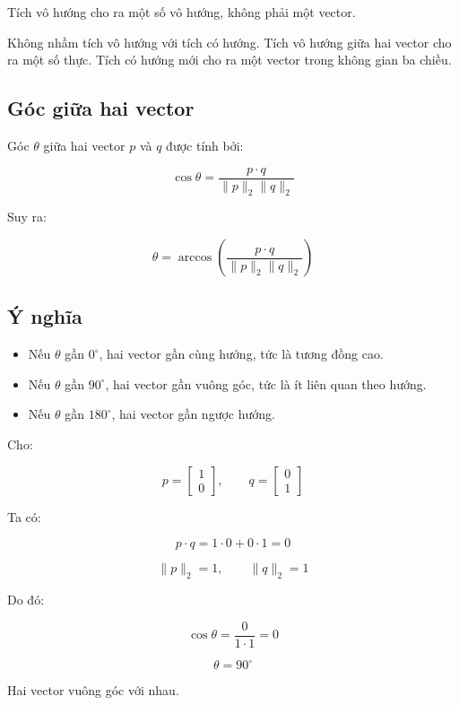 Tích vô hướng cho ra một số vô hướng, không phải một vector.

\begin{luuy}
Không nhầm tích vô hướng với tích có hướng. Tích vô hướng giữa hai vector cho ra một số thực. Tích có hướng mới cho ra một vector trong không gian ba chiều.
\end{luuy}

\subsection{Góc giữa hai vector}

Góc $\theta$ giữa hai vector $p$ và $q$ được tính bởi:

\[
    \cos\theta =
    \frac{p \cdot q}{\|p\|_2 \|q\|_2}
\]

Suy ra:

\[
    \theta = \arccos\left(\frac{p \cdot q}{\|p\|_2 \|q\|_2}\right)
\]

\subsection{Ý nghĩa}

\begin{itemize}
    \item Nếu $\theta$ gần $0^\circ$, hai vector gần cùng hướng, tức là tương đồng cao.
    \item Nếu $\theta$ gần $90^\circ$, hai vector gần vuông góc, tức là ít liên quan theo hướng.
    \item Nếu $\theta$ gần $180^\circ$, hai vector gần ngược hướng.
\end{itemize}

\begin{vidu}
Cho:

\[
    p =
    \begin{bmatrix}
    1\\0
    \end{bmatrix},
    \qquad
    q =
    \begin{bmatrix}
    0\\1
    \end{bmatrix}
\]

Ta có:

\[
    p \cdot q = 1\cdot 0 + 0\cdot 1 = 0
\]

\[
    \|p\|_2=1,\qquad \|q\|_2=1
\]

Do đó:

\[
    \cos\theta = \frac{0}{1\cdot 1}=0
\]

\[
    \theta = 90^\circ
\]

Hai vector vuông góc với nhau.
\end{vidu}

